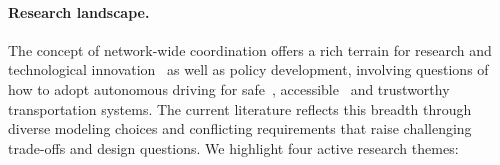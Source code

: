 \documentclass{report}
\theoremstyle{definition}
\theoremstyle{plain}
\begin{document}
\paragraph{Research landscape.}

The concept of network-wide coordination offers a rich terrain for research and
technological innovation~\cite{padmajaExplorationIssuesChallenges2023,yangAutonomousDrivingV2X2022} as well as policy development,
involving questions of how to adopt autonomous driving for safe~\cite{hilaryMakingAutomatedVehicles2022},
accessible~\cite{fatimaEquityIssuesAssociated2024} and trustworthy~\cite{naisehTrustRiskPerception2025}
transportation systems.
%
The current literature reflects this breadth through diverse modeling choices
and conflicting requirements that raise challenging trade-offs and design
questions.
We highlight four active research themes:
\end{document}
